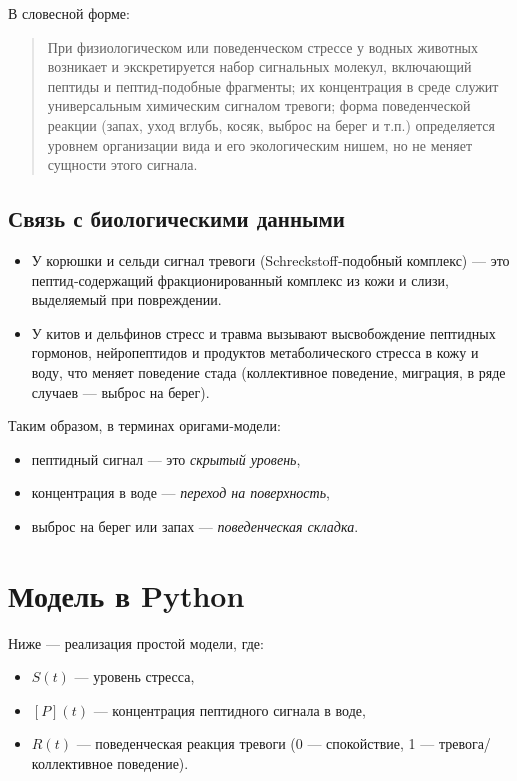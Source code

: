 \documentclass[12pt]{article}
\begin{document}
В словесной форме:

\begin{quote}
При физиологическом или поведенческом стрессе у водных животных возникает и экскретируется набор сигнальных молекул, включающий пептиды и пептид‑подобные фрагменты; их концентрация в среде служит универсальным химическим сигналом тревоги; форма поведенческой реакции (запах, уход вглубь, косяк, выброс на берег и т.п.) определяется уровнем организации вида и его экологическим нишем, но не меняет сущности этого сигнала.
\end{quote}

\subsection{Связь с биологическими данными}

\begin{itemize}
  \item У корюшки и сельди сигнал тревоги (Schreckstoff‑подобный комплекс) — это пептид‑содержащий фракционированный комплекс из кожи и слизи, выделяемый при повреждении.
  \item У китов и дельфинов стресс и травма вызывают высвобождение пептидных гормонов, нейропептидов и продуктов метаболического стресса в кожу и воду, что меняет поведение стада (коллективное поведение, миграция, в ряде случаев — выброс на берег).
\end{itemize}

Таким образом, в терминах оригами‑модели:
\begin{itemize}
  \item пептидный сигнал — это \emph{скрытый уровень},  
  \item концентрация в воде — \emph{переход на поверхность},  
  \item выброс на берег или запах — \emph{поведенческая складка}.
\end{itemize}

\section{Модель в Python}

Ниже — реализация простой модели, где:
\begin{itemize}
  \item $S(t)$ — уровень стресса,  
  \item $[P](t)$ — концентрация пептидного сигнала в воде,  
  \item $R(t)$ — поведенческая реакция тревоги (0 — спокойствие, 1 — тревога/коллективное поведение).
\end{itemize}
\end{document}
